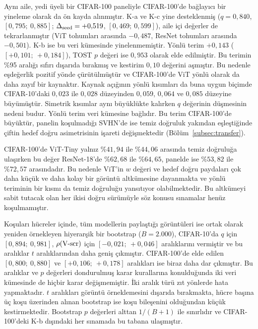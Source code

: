 Aynı aile, yedi üyeli bir CIFAR-100 paneliyle CIFAR-100'de bağlayıcı bir yineleme olarak da ön kayda alınmıştır. K-a ve K-c yine desteklenmiş ($q = 0{,}840$, $[0{,}795;\ 0{,}885]$; $\Delta_{\mathrm{seed}} = +0{,}519$, $[0{,}469;\ 0{,}599]$), aile içi değerler de tekrarlanmıştır (ViT tohumları arasında $-0{,}487$, ResNet tohumları arasında $-0{,}501$). K-b ise bu veri kümesinde yinelenmemiştir. Yönlü terim $+0{,}143$ ($[+0{,}101;\ +0{,}184]$), TOST $p$ değeri ise $0{,}953$ olarak elde edilmiştir. Bu terimin \%95 aralığı sıfırı dışarıda bırakmış ve kestirim $0{,}10$ değerini aşmıştır. Bu nedenle eşdeğerlik pozitif yönde çürütülmüştür ve CIFAR-100'de ViT yönlü olarak da daha zayıf bir kaynaktır. Kaynak açığının yönlü kısımları da buna uygun biçimde CIFAR-10'daki $0{,}023$ ile $0{,}028$ düzeyinden $0{,}059$, $0{,}064$ ve $0{,}085$ düzeyine büyümüştür. Simetrik kısımlar aynı büyüklükte kalırken $q$ değerinin düşmesinin nedeni budur. Yönlü terim veri kümesine bağlıdır. Bu terim CIFAR-100'de büyüktür, panelin koşulmadığı SVHN'de ise temiz doğruluk yakından eşleştiğinde çiftin hedef doğru asimetrisinin işareti değişmektedir (Bölüm~\ref{subsec:transfer}).

CIFAR-100'de ViT-Tiny yalnız $\%41{,}94$ ile $\%44{,}06$ arasında temiz doğruluğa ulaşırken bu değer ResNet-18'de $\%62{,}68$ ile $\%64{,}65$, panelde ise $\%53{,}82$ ile $\%72{,}57$ arasındadır. Bu nedenle ViT'in $w$ değeri ve hedef doğru paydaları çok daha küçük ve daha kolay bir görüntü altkümesine dayanmakta ve yönlü teriminin bir kısmı da temiz doğruluğu yansıtıyor olabilmektedir. Bu altkümeyi sabit tutacak olan her ikisi doğru sürümüyle söz konusu sınamalar henüz koşulmamıştır.

Koşuları hücreler içinde, tüm modellerin paylaştığı görüntüleri ise ortak olarak yeniden örnekleyen hiyerarşik bir bootstrap ($B = 2.000$), CIFAR-10'da $q$ için $[0{,}894;\ 0{,}981]$, $\rho(\mbox{V-scr})$ için $[-0{,}021;\ +0{,}046]$ aralıklarını vermiştir ve bu aralıklar $t$ aralıklarından daha geniş çıkmıştır. CIFAR-100'de elde edilen $[0{,}800;\ 0{,}880]$ ve $[+0{,}106;\ +0{,}178]$ aralıkları ise biraz daha dar çıkmıştır. Bu aralıklar ve $p$ değerleri dondurulmuş karar kurallarına konulduğunda iki veri kümesinde de hiçbir karar değişmemiştir. İki aralık türü zıt yönlerde hata yapmaktadır. $t$ aralıkları görüntü örneklemesini dışarıda bırakmakta, hücre başına üç koşu üzerinden alınan bootstrap ise koşu bileşenini olduğundan küçük kestirmektedir. Bootstrap $p$ değerleri alttan $1/(B+1)$ ile sınırlıdır ve CIFAR-100'deki K-b dışındaki her sınamada bu tabana ulaşmıştır.

